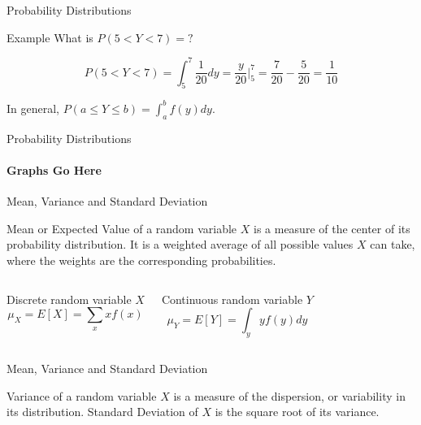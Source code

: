 \documentclass{beamer}\usepackage[]{graphicx}\usepackage[]{color}
\begin{document}
\begin{darkframes}
\begin{frame}[label=lists]{Probability Distributions}
\begin{exampleblock}{Example}
		What is $P(5<Y<7)=?$ 
		
		$$
			P(5<Y<7) = \int_5^7 \frac{1}{20} dy = \frac{y}{20} |_5^7 = \frac{7}{20} - \frac{5}{20} =  \frac{1}{10}
		$$
		
		
		\end{exampleblock}
		
		In general, \alert{$P(a \leq Y \leq b) = \int_a^b f(y)dy$}.
				
	\end{frame}




	\begin{frame}[label=lists]{Probability Distributions}
		\framesubtitle{Graphs Go Here} 


				
	\end{frame}
	
	
	
	\begin{frame}[label=lists]{Mean, Variance and Standard Deviation}
		
		\begin{definition}
			\alert{Mean} or \alert{Expected Value} of a random variable $X$ is a measure of the center of its probability distribution. It is a weighted average of all possible values $X$ can take, where the weights are the corresponding probabilities. 
		\end{definition}
		
		\begin{columns}[onlytextwidth]
        	Discrete random variable $X$
        	$$
				\mu_X = E[X] = \sum_x x f(x)	        	
        	$$
        	
        	Continuous random variable $Y$
        	$$
				\mu_Y = E[Y] = \int_y y f(y) dy	        	
        	$$
        	        
        \end{columns}


				
	\end{frame}





	\begin{frame}[label=lists]{Mean, Variance and Standard Deviation}
		
		\begin{definition}
			\alert{Variance} of a random variable $X$ is a measure of the dispersion, or variability in its distribution. \alert{Standard Deviation} of $X$ is the square root of its variance.
		\end{definition}
		

\end{frame}
\end{darkframes}
\end{document}
